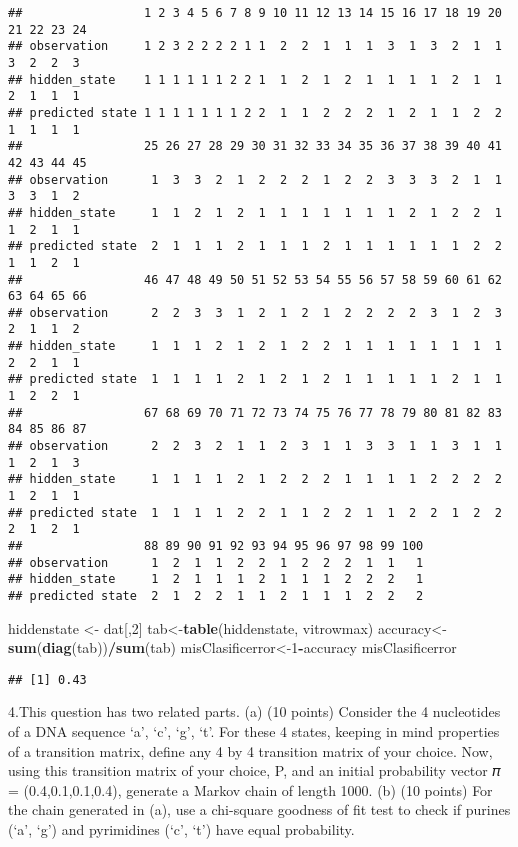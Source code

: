 \documentclass[
]{article}
\newenvironment{Shaded}{\begin{snugshade}}{\end{snugshade}}
\newcommand{\DecValTok}[1]{\textcolor[rgb]{0.00,0.00,0.81}{#1}}
\newcommand{\KeywordTok}[1]{\textcolor[rgb]{0.13,0.29,0.53}{\textbf{#1}}}
\newcommand{\NormalTok}[1]{#1}
\newcommand{\OperatorTok}[1]{\textcolor[rgb]{0.81,0.36,0.00}{\textbf{#1}}}
\newcommand{\StringTok}[1]{\textcolor[rgb]{0.31,0.60,0.02}{#1}}
\begin{document}
\begin{verbatim}
##                 1 2 3 4 5 6 7 8 9 10 11 12 13 14 15 16 17 18 19 20 21 22 23 24
## observation     1 2 3 2 2 2 2 1 1  2  2  1  1  1  3  1  3  2  1  1  3  2  2  3
## hidden_state    1 1 1 1 1 1 2 2 1  1  2  1  2  1  1  1  1  2  1  1  2  1  1  1
## predicted state 1 1 1 1 1 1 1 2 2  1  1  2  2  2  1  2  1  1  2  2  1  1  1  1
##                 25 26 27 28 29 30 31 32 33 34 35 36 37 38 39 40 41 42 43 44 45
## observation      1  3  3  2  1  2  2  2  1  2  2  3  3  3  2  1  1  3  3  1  2
## hidden_state     1  1  2  1  2  1  1  1  1  1  1  1  2  1  2  2  1  1  2  1  1
## predicted state  2  1  1  1  2  1  1  1  2  1  1  1  1  1  1  2  2  1  1  2  1
##                 46 47 48 49 50 51 52 53 54 55 56 57 58 59 60 61 62 63 64 65 66
## observation      2  2  3  3  1  2  1  2  1  2  2  2  2  3  1  2  3  2  1  1  2
## hidden_state     1  1  1  2  1  2  1  2  2  1  1  1  1  1  1  1  1  2  2  1  1
## predicted state  1  1  1  1  2  1  2  1  2  1  1  1  1  1  2  1  1  1  2  2  1
##                 67 68 69 70 71 72 73 74 75 76 77 78 79 80 81 82 83 84 85 86 87
## observation      2  2  3  2  1  1  2  3  1  1  3  3  1  1  3  1  1  1  2  1  3
## hidden_state     1  1  1  1  2  1  2  2  2  1  1  1  1  2  2  2  2  1  2  1  1
## predicted state  1  1  1  1  2  2  1  1  2  2  1  1  2  2  1  2  2  2  1  2  1
##                 88 89 90 91 92 93 94 95 96 97 98 99 100
## observation      1  2  1  1  2  2  1  2  2  2  1  1   1
## hidden_state     1  2  1  1  1  2  1  1  1  2  2  2   1
## predicted state  2  1  2  2  1  1  2  1  1  1  2  2   2
\end{verbatim}

\begin{Shaded}
\begin{Highlighting}[]
\NormalTok{hiddenstate <-}\StringTok{ }\NormalTok{dat[,}\DecValTok{2}\NormalTok{]}
\NormalTok{tab<-}\KeywordTok{table}\NormalTok{(hiddenstate, vitrowmax)}
\NormalTok{accuracy<-}\KeywordTok{sum}\NormalTok{(}\KeywordTok{diag}\NormalTok{(tab))}\OperatorTok{/}\KeywordTok{sum}\NormalTok{(tab)}
\NormalTok{misClasificerror<-}\DecValTok{1}\OperatorTok{-}\NormalTok{accuracy}
\NormalTok{misClasificerror}
\end{Highlighting}
\end{Shaded}

\begin{verbatim}
## [1] 0.43
\end{verbatim}

4.This question has two related parts. (a) (10 points) Consider the 4
nucleotides of a DNA sequence `a', `c', `g', `t'. For these 4 states,
keeping in mind properties of a transition matrix, define any 4 by 4
transition matrix of your choice. Now, using this transition matrix of
your choice, P, and an initial probability vector 𝜋 = (0.4,0.1,0.1,0.4),
generate a Markov chain of length 1000. (b) (10 points) For the chain
generated in (a), use a chi-square goodness of fit test to check if
purines (`a', `g') and pyrimidines (`c', `t') have equal probability.
\end{document}

